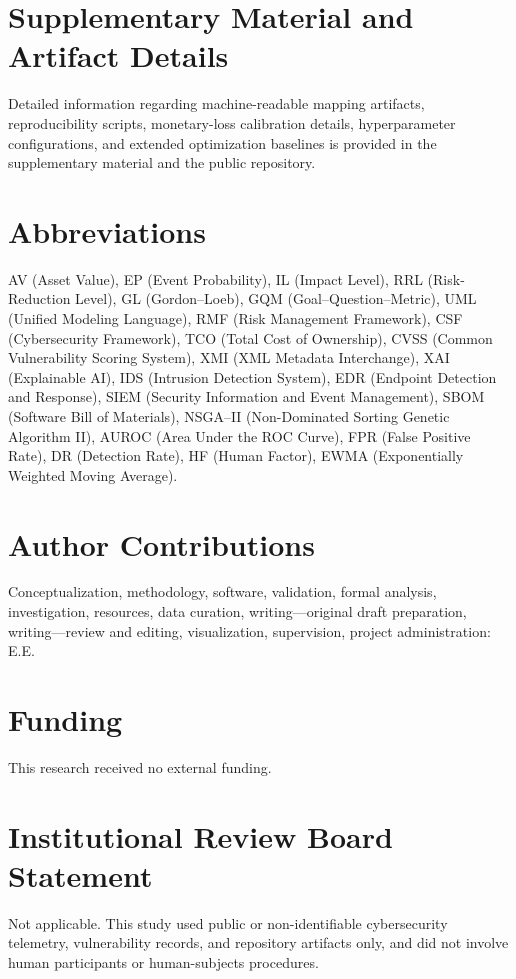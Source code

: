 \documentclass[preprint,12pt]{elsarticle}
\begin{document}
\appendix
\section{Supplementary Material and Artifact Details}
\label{app:calibration}
\label{app:opt-details}
\label{app:opt-baselines}
\label{app:full-mapping}
Detailed information regarding machine-readable mapping artifacts, reproducibility scripts, monetary-loss calibration details, hyperparameter configurations, and extended optimization baselines is provided in the supplementary material and the public repository.

\section*{Abbreviations}
\noindent AV (Asset Value), EP (Event Probability), IL (Impact Level), RRL (Risk-Reduction Level), GL (Gordon--Loeb), GQM (Goal--Question--Metric), UML (Unified Modeling Language), RMF (Risk Management Framework), CSF (Cybersecurity Framework), TCO (Total Cost of Ownership), CVSS (Common Vulnerability Scoring System), XMI (XML Metadata Interchange), XAI (Explainable AI), IDS (Intrusion Detection System), EDR (Endpoint Detection and Response), SIEM (Security Information and Event Management), SBOM (Software Bill of Materials), NSGA--II (Non-Dominated Sorting Genetic Algorithm II), AUROC (Area Under the ROC Curve), FPR (False Positive Rate), DR (Detection Rate), HF (Human Factor), EWMA (Exponentially Weighted Moving Average).

\section*{Author Contributions}
Conceptualization, methodology, software, validation, formal analysis, investigation, resources, data curation, writing---original draft preparation, writing---review and editing, visualization, supervision, project administration: E.E.

\section*{Funding}
This research received no external funding.

\section*{Institutional Review Board Statement}
Not applicable. This study used public or non-identifiable cybersecurity telemetry, vulnerability records, and repository artifacts only, and did not involve human participants or human-subjects procedures.
\end{document}
